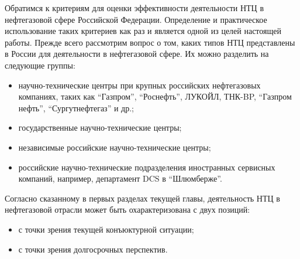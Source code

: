 Обратимся к критериям для оценки эффективности деятельности НТЦ в нефтегазовой сфере Российской Федерации.
Определение и практическое использование таких критериев как раз и является одной из целей настоящей работы. 
Прежде всего рассмотрим вопрос о том, каких типов НТЦ представлены в России для деятельности в нефтегазовой сфере.
Их можно разделить на следующие группы:  

\begin{itemize} 
	\tightlist 
	\item научно-технические центры при крупных российских нефтегазовых компаниях, таких как ``Газпром'', ``Роснефть'', ЛУКОЙЛ, ТНК-BP, ``Газпром нефть'', ``Сургутнефтегаз'' и др.; 
	\item государственные научно-технические центры; 
	\item независимые российские научно-технические центры; 
	\item российские научно-технические подразделения иностранных сервисных компаний, например, департамент DCS в ``Шлюмберже''.
\end{itemize}  

Согласно сказанному в первых разделах текущей главы, деятельность НТЦ в нефтегазовой отрасли может быть охарактеризована с двух позиций:  \begin{itemize} 
	\tightlist 
	\item с точки зрения текущей конъюктурной ситуации;
	\item с точки зрения долгосрочных перспектив.
\end{itemize}  

